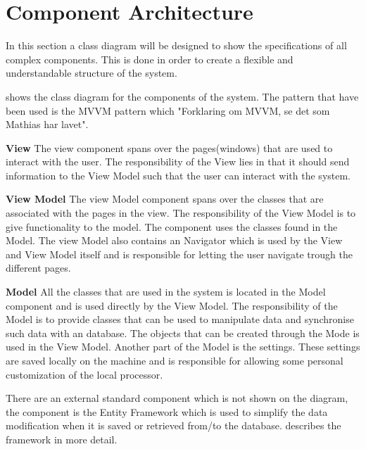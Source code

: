\section{Component Architecture}
In this section a class diagram will be designed to show the specifications of all complex components. This is done in order to create a flexible and understandable structure of the system.

\label{LayerDiagram}

 shows the class diagram for the components of the system. The pattern that have been used is the MVVM pattern which "Forklaring om MVVM, se det som Mathias har lavet".

\textbf{View}
The view component spans over the pages(windows) that are used to interact with the user. The responsibility of the View lies in that it should send information to the View Model such that the user can interact with the system.

\textbf{View Model}
The view Model component spans over the classes that are associated with the pages in the view. The responsibility of the View Model is to give functionality to the model. The component uses the classes found in the Model. The view Model also contains an Navigator which is used by the View and View Model itself and is responsible for letting the user navigate trough the different pages.

\textbf{Model}
All the classes that are used in the system is located in the Model component and is used directly by the View Model. The responsibility of the Model is to provide classes that can be used to manipulate data and synchronise such data with an database. The objects that can be created through the Mode is used in the View Model. Another part of the Model is the settings. These settings are saved locally on the machine and is responsible for allowing some personal customization of the local processor. 

There are an external standard component which is not shown on the diagram, the component is the Entity Framework which is used to simplify the data modification when it is saved or retrieved from/to the database.  describes the framework in more detail.